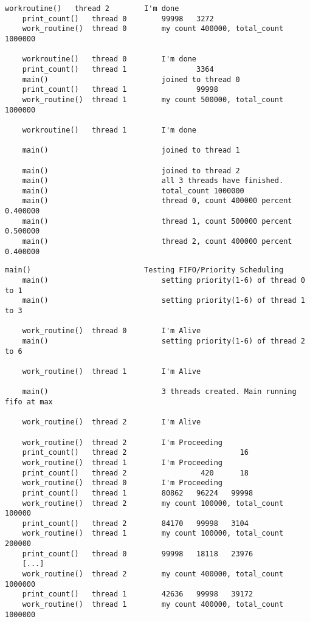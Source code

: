 \begin{parts}
\begin{solution}
\begin{Verbatim}[label={\$ sudo ./prog1 f}, fontsize=\small]
    workroutine()   thread 2        I'm done
    print_count()   thread 0        99998   3272
    work_routine()  thread 0        my count 400000, total_count 1000000
    
    workroutine()   thread 0        I'm done
    print_count()   thread 1                3364
    main()                          joined to thread 0 
    print_count()   thread 1                99998
    work_routine()  thread 1        my count 500000, total_count 1000000
    
    workroutine()   thread 1        I'm done
    
    main()                          joined to thread 1 
    
    main()                          joined to thread 2 
    main()                          all 3 threads have finished. 
    main()                          total_count 1000000
    main()                          thread 0, count 400000 percent 0.400000
    main()                          thread 1, count 500000 percent 0.500000
    main()                          thread 2, count 400000 percent 0.400000
    \end{Verbatim}
    \vspace{0.1em}
    \begin{Verbatim}[label={\$ sudo ./prog1 p}, fontsize=\small]
    main()                          Testing FIFO/Priority Scheduling
    main()                          setting priority(1-6) of thread 0 to 1
    main()                          setting priority(1-6) of thread 1 to 3
    
    work_routine()  thread 0        I'm Alive
    main()                          setting priority(1-6) of thread 2 to 6
    
    work_routine()  thread 1        I'm Alive
    
    main()                          3 threads created. Main running fifo at max
    
    work_routine()  thread 2        I'm Alive
    
    work_routine()  thread 2        I'm Proceeding
    print_count()   thread 2                          16
    work_routine()  thread 1        I'm Proceeding
    print_count()   thread 2                 420      18
    work_routine()  thread 0        I'm Proceeding
    print_count()   thread 1        80862   96224   99998
    work_routine()  thread 2        my count 100000, total_count 100000
    print_count()   thread 2        84170   99998   3104
    work_routine()  thread 1        my count 100000, total_count 200000
    print_count()   thread 0        99998   18118   23976
    [...]
    work_routine()  thread 2        my count 400000, total_count 1000000
    print_count()   thread 1        42636   99998   39172
    work_routine()  thread 1        my count 400000, total_count 1000000
    

\end{Verbatim}
\end{solution}
\end{parts}
